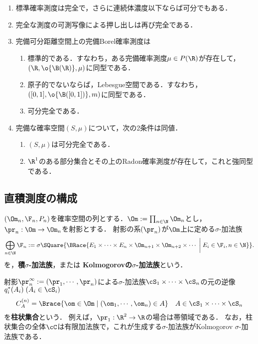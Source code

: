 \documentclass[uplatex,dvipdfmx]{jsreport}
\begin{document}
\begin{theorem}[可分完全性は抽象Lebesgue空間よりもさらに狭いクラスである]\mbox{}
    \begin{enumerate}
        \item 標準確率測度は完全で，さらに連続体濃度以下ならば可分でもある．
        \item 完全な測度の可測写像による押し出しは再び完全である．
        \item 完備可分距離空間上の完備Borel確率測度は
        \begin{enumerate}
            \item 標準的である．すなわち，ある完備確率測度$\mu\in P(\R)$が存在して，$(\R,\o{\B(\R)},\mu)$に同型である．
            \item 原子的でないならば，Lebesgue空間である．すなわち，$([0,1],\o{\B([0,1])},m)$に同型である．
            \item 可分完全である．
        \end{enumerate}
        \item 完備な確率空間$(S,\mu)$について，次の2条件は同値．
        \begin{enumerate}
            \item $(S,\mu)$は可分完全である．
            \item $\R^1$のある部分集合とその上のRadon確率測度が存在して，これと強同型である．
        \end{enumerate}
    \end{enumerate}
\end{theorem}

\subsection{直積測度の構成}

\begin{definition}
    $(\Om_n,\F_n,P_n)$を確率空間の列とする．$\Om:=\prod_{n\in\N}\Om_n$とし，$\pr_n:\Om\to\Om_n$を射影とする．
    射影の系$(\pr_n)$が$\Om$上に定める$\sigma$-加法族
    \[\bigoplus_{n\in\N}\F_n:=\sigma\SQuare{\BRace{E_1\times\cdots\times E_n\times\Om_{n+1}\times\Om_{n+2}\times\cdots\;\bigg|\;E_i\in\F_i,n\in\N}}.\]
    を，\textbf{積$\sigma$-加法族}，または
    \textbf{Kolmogorovの$\sigma$-加法族}という．
\end{definition}
\begin{remarks}\label{remark-cylinder-sets}
    射影$\pr^\infty_{n}:=(\pr_1,\cdots,\pr_n)$による$\sigma$-加法族$\cS_1\times\cdots\times\cS_n$の元の逆像$q_i^*(A_i)\;(A_i\in\cS_i)$
    \[C_A^{(n)}=\Brace{\om\in\Om\mid(\om_1,\cdots,\om_n)\in A}\quad A\in\cS_1\times\cdots\times\cS_n\]
    を\textbf{柱状集合}という．
    例えば，$\pr_1:\R^2\to\R$の場合は帯領域である．
    なお，柱状集合の全体$\cC$は有限加法族で，これが生成する$\sigma$-加法族がKolmogorov $\sigma$-加法族である．
\end{remarks}
\end{document}
